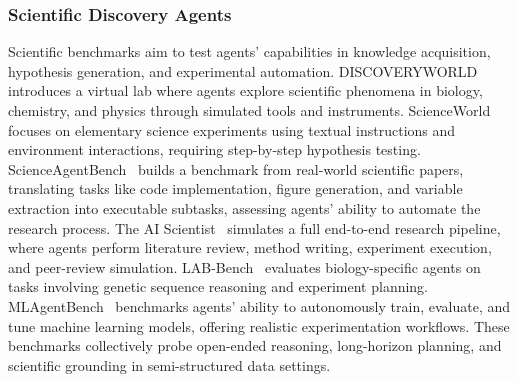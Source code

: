 \subsubsection{Scientific Discovery Agents}
Scientific benchmarks aim to test agents' capabilities in knowledge acquisition, hypothesis generation, and experimental automation. DISCOVERYWORLD~\cite{jansen2024discoveryworld} introduces a virtual lab where agents explore scientific phenomena in biology, chemistry, and physics through simulated tools and instruments. ScienceWorld~\cite{ruoyao2022scienceworld} focuses on elementary science experiments using textual instructions and environment interactions, requiring step-by-step hypothesis testing. ScienceAgentBench~\cite{ziru2024scienceagentbench} builds a benchmark from real-world scientific papers, translating tasks like code implementation, figure generation, and variable extraction into executable subtasks, assessing agents’ ability to automate the research process. The AI Scientist~\cite{chris2024the} simulates a full end-to-end research pipeline, where agents perform literature review, method writing, experiment execution, and peer-review simulation. LAB-Bench~\cite{jon2024labbench} evaluates biology-specific agents on tasks involving genetic sequence reasoning and experiment planning. MLAgentBench~\cite{qian2023mlagentbench} benchmarks agents’ ability to autonomously train, evaluate, and tune machine learning models, offering realistic experimentation workflows. These benchmarks collectively probe open-ended reasoning, long-horizon planning, and scientific grounding in semi-structured data settings.

